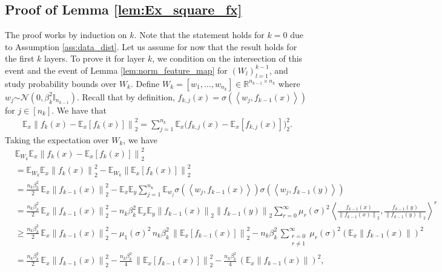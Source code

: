 \documentclass[11pt]{article}
\def\RR{\mathbb{R}}
\newcommand{\E}{\mathbb{E}}
\newcommand{\distas}[1]{\mathbin{\overset{#1}{\sim}}}
\newenvironment{proof}{\par\noindent{\bf Proof:\ }}{\hfill$\Box$\\[2mm]}
\newcommand{\Id}{\mathbb{I}}
\newcommand{\inner}[1]{\left\langle#1\right\rangle}
\newcommand{\norm}[1]{\left\|#1\right\|}
\begin{document}
\subsection{Proof of Lemma \ref{lem:Ex_square_fx}}
    The proof works by induction on $k.$
    Note that the statement holds for $k=0$ due to Assumption \ref{ass:data_dist}.
    Let us assume for now that the result holds for the first $k$ layers.
    To prove it for layer $k$, we condition on the intersection of this event and the event of Lemma \ref{lem:norm_feature_map} for $(W_l)_{l=1}^{k-1}$,
    and study probability bounds over $W_k$.
    Define $W_k=[w_1,\ldots,w_{n_k}]\in\RR^{n_{k-1}\times n_k}$ where $w_j\distas{}\mathcal{N}(0,\beta_k^2\Id_{n_{k-1}}).$
    Recall that by definition, $f_{k,j}(x)=\sigma(\inner{w_j, f_{k-1}(x)})$ for $j\in[n_k].$
    We have that
    \begin{align*}
	\E_x \norm{f_k(x) - \E_{x}[f_k(x)]}_2^2 = \sum_{j=1}^{n_k} \E_x \Big(f_{k,j}(x) - \E_{x}[f_{k,j}(x)]\Big)_2^2 .
    \end{align*}
    Taking the expectation over $W_k$, we have
    \begin{align*}
	&\E_{W_k} \E_x \norm{f_k(x) - \E_{x}[f_k(x)]}_2^2\\
	&= \E_{W_k}\E_x\norm{f_k(x)}_2^2 - \E_{W_k}\norm{\E_x[f_k(x)]}_2^2 \\
	&= \frac{n_k\beta_k^2}{2}\, \E_x\norm{f_{k-1}(x)}_2^2 - \E_x\E_y \sum_{j=1}^{n_k} \E_{w_j} \sigma\left(\inner{w_j,f_{k-1}(x)}\right) \sigma\left(\inner{w_j,f_{k-1}(y)}\right) \\
	&= \frac{n_k\beta_k^2}{2}\, \E_x\norm{f_{k-1}(x)}_2^2 - n_k\beta_k^2\, \E_x\E_y\norm{f_{k-1}(x)}_2 \norm{f_{k-1}(y)}_2  \sum_{r=0}^{\infty} \mu_r(\sigma)^2 \inner{\frac{f_{k-1}(x)}{\norm{f_{k-1}(x)}_2},\frac{f_{k-1}(y)}{\norm{f_{k-1}(y)}_2}}^r  \\
	&\geq \frac{n_k\beta_k^2}{2}\, \E_x\norm{f_{k-1}(x)}_2^2 - \mu_1(\sigma)^2\,n_k\beta_k^2\, \norm{\E_x[f_{k-1}(x)]}_2^2 - n_k\beta_k^2\, \sum_{\substack{r=0\\r\neq 1}}^{\infty} \mu_r(\sigma)^2 (\E_x\norm{f_{k-1}(x)})^2 \\
	&= \frac{n_k\beta_k^2}{2}\, \E_x\norm{f_{k-1}(x)}_2^2 - \frac{n_k\beta_k^2}{4}\, \norm{\E_x[f_{k-1}(x)]}_2^2 - \frac{n_k\beta_k^2}{4}\, (\E_x\norm{f_{k-1}(x)})^2,
    \end{align*}
\end{document}
